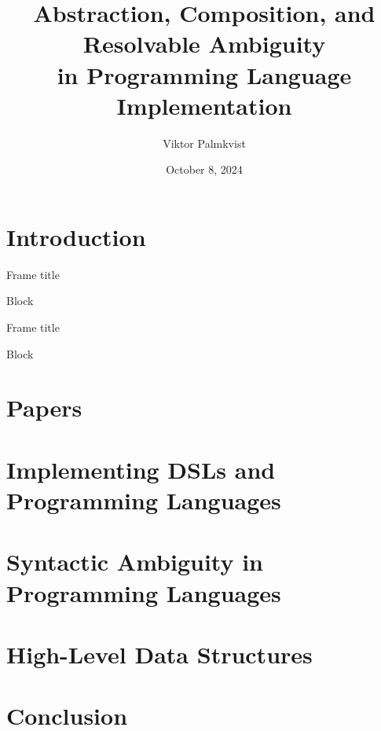 \documentclass[17pt, t, lualatex]{beamer}
\title{Abstraction, Composition, and Resolvable Ambiguity\\in Programming Language Implementation}
\date{October 8, 2024}
\institute[KTH]{KTH Royal Institute of Technology}
\author{Viktor Palmkvist}
\begin{document}
\inserttitlepage

\section{Introduction}

\insertsectionpage

\begin{frame}{Frame title}
\begin{block}{Block}
\end{block}
\end{frame}
\begin{frame}{Frame title}
\begin{block}{Block}
\end{block}
\end{frame}

\section{Papers}
\section[Implementing Languages]{Implementing DSLs and Programming Languages}
\section[Ambiguity]{Syntactic Ambiguity in Programming Languages}
\section[Data Structures]{High-Level Data Structures}
\section{Conclusion}

\insertendpage
\end{document}
